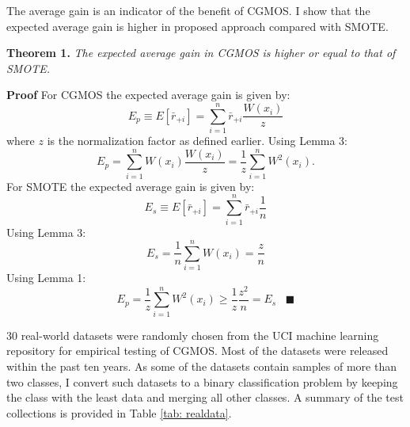 \documentclass{iitthesis}
\begin{document}
The average gain is an indicator of the benefit of CGMOS. I show that the expected average gain is higher in proposed approach compared with SMOTE.

\noindent \textbf{Theorem 1.} \textit{The expected average gain in CGMOS is higher or equal to that of SMOTE.}


\noindent\textbf{Proof} For CGMOS the expected average gain is given by:
\begin{equation}
E_p\equiv E[\bar{r}_{+i}] = \sum_{i=1}^n \bar{r}_{+i} \frac{W(x_i)}{z}
\end{equation}
where $z$ is the normalization factor as defined earlier. 
Using Lemma 3:
\begin{equation}
E_p=\sum_{i=1}^n W(x_i)\frac{W(x_i)}{z}=\frac{1}{z}\sum_{i=1}^n W^2(x_i).
\end{equation}
\newline
\noindent For SMOTE the expected average gain is given by:
\begin{equation}
E_s\equiv E[\bar{r}_{+i}] = \sum_{i=1}^n \bar{r}_{+i} \frac{1}{n}
\end{equation}
Using Lemma 3:
\begin{equation}
E_s = \frac{1}{n}\sum_{i=1}^n W(x_i) =\frac{z}{n}
\end{equation}
Using Lemma 1:
\begin{equation}
E_p= \frac{1}{z}\sum_{i=1}^n W^2(x_i)\geq \frac{1}{z}\frac{z^2}{n}= E_s \;\;\;\blacksquare
\end{equation}


 30 real-world datasets were randomly chosen from the UCI machine learning repository \cite{Lichman:2013} for empirical testing of CGMOS. Most of the datasets were released within the past ten years. As some of the datasets contain samples of more than two classes, I convert such datasets to a binary classification problem by keeping the class with the least data and merging all other classes. A summary of the test collections is provided in Table \ref{tab: realdata}.
\end{document}
